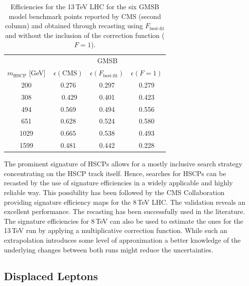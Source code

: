 \begin{table}[h]
\footnotesize
\begin{center}
\begin{tabular}{c|ccc}
 & \multicolumn{3}{c}{ GMSB } \\
$m_\text{HSCP}$ [{\rm GeV}] & \,$\epsilon(\text{CMS})$ & $\epsilon(F_\text{best-fit})$& $\epsilon(F=1)$ \\
\hline
200     &\,0.276   & 0.297  & 0.279 \\
308   & \, 0.429 &  0.401 & 0.423  \\
494    & \,0.569 & 0.494 & 0.556  \\ 
651  &  \,0.628 & 0.524 & 0.580 \\
1029 &\,0.665  & 0.538  & 0.493\\
1599 &  \,0.481  & 0.442  & 0.228 \\
\hline
\end{tabular} 
\end{center}
\caption{Efficiencies for the 13\,TeV LHC for the six GMSB model benchmark
points reported by CMS (second column)
and obtained through recasting using $F_\text{best-fit}$ and without the inclusion of the correction function ($F=1$).}
\label{tab:effGMSB}
\end{table}


\vskip 0.1in
\vskip 0.1in
The prominent signature of HSCPs allows for a mostly inclusive search strategy concentrating
on the HSCP track itself. Hence, searches for HSCPs can be recasted by the use of signature 
efficiencies in a widely applicable and highly reliable way. This possibility has been followed 
by the CMS Collaboration providing signature 
efficiency maps for the 8\,TeV LHC\@. The validation reveals an excellent performance. The
recasting has been successfully used in the literature.
The signature efficiencies for 8\,TeV can also be used to estimate the ones for the 13\,TeV run by applying
a multiplicative correction function. While such an extrapolation introduces some level of approximation
a better knowledge of the underlying changes between both runs might reduce the uncertainties.


\subsection{Displaced Leptons} 
\label{sec:ch5-displacedLeptons}

